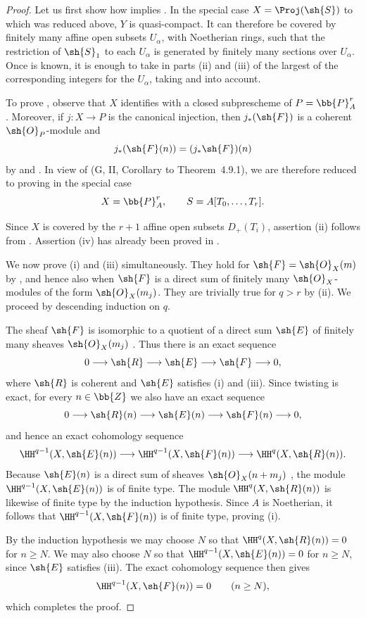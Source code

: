 \begin{proof}
Let us first show how  implies .
In the special case $X=\Proj(\sh{S})$ to which  was reduced above, $Y$ is quasi-compact.
It can therefore be covered by finitely many affine open subsets $U_\alpha$, with Noetherian rings, such that the restriction of $\sh{S}_1$ to each $U_\alpha$ is generated by finitely many sections over $U_\alpha$.
Once  is known, it is enough to take in parts (ii) and (iii) of  the largest of the corresponding integers for the $U_\alpha$, taking  and  into account.

To prove , observe that $X$ identifies with a closed subprescheme of $P=\bb{P}_A^r$ .
Moreover, if $j:X\to P$ is the canonical injection, then $j_*(\sh{F})$ is a coherent $\sh{O}_P$-module and
\[
  j_*(\sh{F}(n))=(j_*\sh{F})(n)
\]
by  and .
In view of (G, II, Corollary to Theorem~4.9.1), we are therefore reduced to proving  in the special case
\[
  X=\bb{P}_A^r,
  \qquad S=A[T_0,\ldots,T_r].
\]


Since $X$ is covered by the $r+1$ affine open subsets $D_+(T_i)$, assertion (ii) follows from .
Assertion (iv) has already been proved in .

We now prove (i) and (iii) simultaneously.
They hold for $\sh{F}=\sh{O}_X(m)$ by , and hence also when $\sh{F}$ is a direct sum of finitely many $\sh{O}_X$-modules of the form $\sh{O}_X(m_j)$.
They are trivially true for $q>r$ by (ii).
We proceed by descending induction on $q$.

The sheaf $\sh{F}$ is isomorphic to a quotient of a direct sum $\sh{E}$ of finitely many sheaves $\sh{O}_X(m_j)$ .
Thus there is an exact sequence
\[
  0\longrightarrow\sh{R}\longrightarrow\sh{E}
   \longrightarrow\sh{F}\longrightarrow0,
\]
where $\sh{R}$ is coherent  and $\sh{E}$ satisfies (i) and (iii).
Since twisting is exact, for every $n\in\bb{Z}$ we also have an exact sequence
\[
  0\longrightarrow\sh{R}(n)\longrightarrow\sh{E}(n)
   \longrightarrow\sh{F}(n)\longrightarrow0,
\]
and hence an exact cohomology sequence
\[
  \HH^{q-1}(X,\sh{E}(n))
  \longrightarrow\HH^{q-1}(X,\sh{F}(n))
  \longrightarrow\HH^q(X,\sh{R}(n)).
\]
Because $\sh{E}(n)$ is a direct sum of sheaves $\sh{O}_X(n+m_j)$ , the module $\HH^{q-1}(X,\sh{E}(n))$ is of finite type.
The module $\HH^q(X,\sh{R}(n))$ is likewise of finite type by the induction hypothesis.
Since $A$ is Noetherian, it follows that $\HH^{q-1}(X,\sh{F}(n))$ is of finite type, proving (i).

By the induction hypothesis we may choose $N$ so that $\HH^q(X,\sh{R}(n))=0$ for $n\geq N$.
We may also choose $N$ so that $\HH^{q-1}(X,\sh{E}(n))=0$ for $n\geq N$, since $\sh{E}$ satisfies (iii).
The exact cohomology sequence then gives
\[
  \HH^{q-1}(X,\sh{F}(n))=0
  \qquad(n\geq N),
\]
which completes the proof.
\end{proof}

